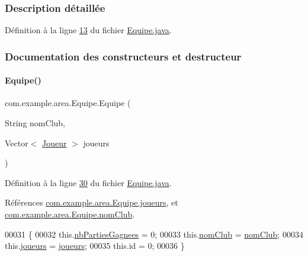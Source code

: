 \subsubsection{Description détaillée}


Définition à la ligne \hyperlink{_equipe_8java_source_l00013}{13} du fichier \hyperlink{_equipe_8java_source}{Equipe.\+java}.



\subsubsection{Documentation des constructeurs et destructeur}
\mbox{\label{classcom_1_1example_1_1area_1_1_equipe_a313ec6933f3fb30f68ec93c7c290c6ee}} 
\paragraph{\texorpdfstring{Equipe()}{Equipe()}}
{\footnotesize\ttfamily com.\+example.\+area.\+Equipe.\+Equipe (\begin{DoxyParamCaption}\item[{String}]{nom\+Club,  }\item[{Vector$<$ \hyperlink{classcom_1_1example_1_1area_1_1_joueur}{Joueur} $>$}]{joueurs }\end{DoxyParamCaption})}



Définition à la ligne \hyperlink{_equipe_8java_source_l00030}{30} du fichier \hyperlink{_equipe_8java_source}{Equipe.\+java}.



Références \hyperlink{_equipe_8java_source_l00027}{com.\+example.\+area.\+Equipe.\+joueurs}, et \hyperlink{_equipe_8java_source_l00026}{com.\+example.\+area.\+Equipe.\+nom\+Club}.


\begin{DoxyCode}
00031     \{
00032         this.\hyperlink{classcom_1_1example_1_1area_1_1_equipe_af01e154be3aaa3fbcf909c3a44734b2e}{nbPartiesGagnees} = 0;
00033         this.\hyperlink{classcom_1_1example_1_1area_1_1_equipe_ac93205e041df88192dd6b1dfc8488e0a}{nomClub} = \hyperlink{classcom_1_1example_1_1area_1_1_equipe_ac93205e041df88192dd6b1dfc8488e0a}{nomClub};
00034         this.\hyperlink{classcom_1_1example_1_1area_1_1_equipe_a13f5e9288dec5f11829e1a7ccc21cdc9}{joueurs} = \hyperlink{classcom_1_1example_1_1area_1_1_equipe_a13f5e9288dec5f11829e1a7ccc21cdc9}{joueurs};
00035         this.\textcolor{keywordtype}{id} = 0;
00036     \}
\end{DoxyCode}


